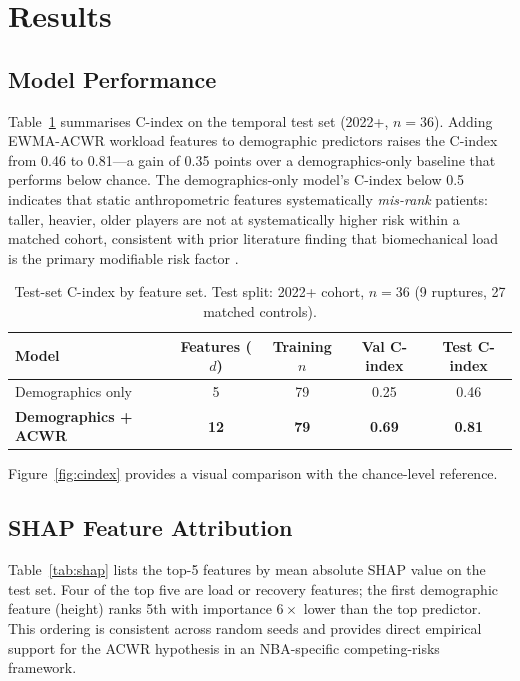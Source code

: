 \documentclass{article}
\begin{document}
\section{Results}
\label{sec:results}

\subsection{Model Performance}

Table~\ref{tab:cindex} summarises C-index on the temporal test set (2022+,
$n=36$).  Adding EWMA-ACWR workload features to demographic predictors raises
the C-index from 0.46 to 0.81---a gain of 0.35 points over a demographics-only
baseline that performs below chance.  The demographics-only model's C-index
below 0.5 indicates that static anthropometric features systematically
\emph{mis-rank} patients: taller, heavier, older players are not at
systematically higher risk within a matched cohort, consistent with prior
literature finding that biomechanical load is the primary modifiable
risk factor \citep{gabbett2016}.

\begin{table}[h]
\centering
\caption{Test-set C-index by feature set. Test split: 2022+ cohort,
$n=36$ (9 ruptures, 27 matched controls).}
\label{tab:cindex}
\begin{tabular}{lcccc}
\toprule
Model & Features ($d$) & Training $n$ & Val C-index & \textbf{Test C-index} \\
\midrule
Demographics only & 5  & 79 & 0.25 & 0.46 \\
\textbf{Demographics + ACWR}   & \textbf{12} & \textbf{79} & \textbf{0.69} & \textbf{0.81} \\
\bottomrule
\end{tabular}
\end{table}

\noindent Figure~\ref{fig:cindex} provides a visual comparison with the
chance-level reference.

\subsection{SHAP Feature Attribution}

Table~\ref{tab:shap} lists the top-5 features by mean absolute SHAP value on
the test set.  Four of the top five are load or recovery features; the first
demographic feature (height) ranks 5th with importance $6\times$ lower than the
top predictor.  This ordering is consistent across random seeds and provides
direct empirical support for the ACWR hypothesis in an NBA-specific competing-risks
framework.
\end{document}
